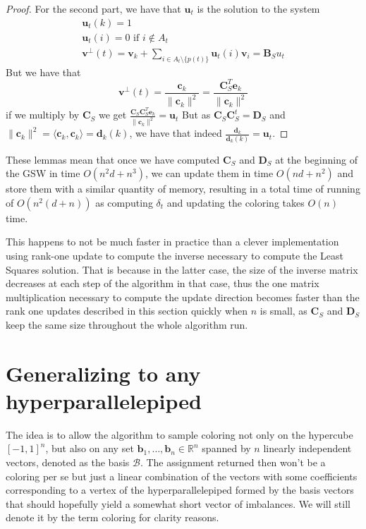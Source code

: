 \documentclass[12pt]{article}
\begin{document}
\begin{proof}
For the second part, we have that $\textbf{u}_t$ is the solution to the system \begin{align*}\textbf{u}_t(k) =1\\
            \textbf{u}_t(i) =0 \text{ if } i \notin A_t\\
            \textbf{v}^\perp(t) = \textbf{v}_{k} + \sum_{i \in A_t\setminus\{p(t)\}} \textbf{u}_t(i)\textbf{v}_i=\textbf{B}_Su_t\end{align*}
But we have that $$\textbf{v}^\perp(t)=\frac{\textbf{c}_k}{\|\textbf{c}_k\|^2}=\frac{\textbf{C}_S^T\textbf{e}_k}{\|\textbf{c}_k\|^2}$$
if we multiply by $\textbf{C}_S$ we get $\frac{\textbf{C}_S\textbf{C}_S^T\textbf{e}_k}{\|\textbf{c}_k\|^2}=\textbf{u}_t$ But as $\textbf{C}_S\textbf{C}_S^t=\textbf{D}_S$ and $\|\textbf{c}_k\|^2=\langle \textbf{c}_k,\textbf{c}_k\rangle=\textbf{d}_k(k)$, we have that indeed $\frac{\textbf{d}_k}{\textbf{d}_k(k)}=\textbf{u}_t$.
\end{proof}
These lemmas mean that once we have computed $\textbf{C}_S$ and $\textbf{D}_S$ at the beginning of the GSW in time $O(n^2d+n^3)$, we can update them in time $O(nd+n^2)$ and store them with a similar quantity of memory, resulting in a total time of running of $O(n^2(d+n))$ as computing $\delta_t$ and updating the coloring takes $O(n)$ time.

This happens to not be much faster in practice than a clever implementation using rank-one update to compute the inverse necessary to compute the Least Squares solution. That is because in the latter case, the size of the inverse matrix decreases at each step of the algorithm in that case, thus the one matrix multiplication necessary to compute the update direction becomes faster than the rank one updates described in this section quickly when $n$ is small, as $\textbf{C}_S$ and $\textbf{D}_S$ keep the same size throughout the whole algorithm run.


\section{Generalizing to any hyperparallelepiped}\label{different_basis_section}
The idea is to allow the algorithm to sample coloring not only on the hypercube $[-1,1]^n$, but also on any set $\textbf{b}_1,\dots, \textbf{b}_n\in\mathbb{R}^n$ spanned by $n$ linearly independent vectors, denoted as the basis $\mathcal{B}$. The assignment returned then won't be a coloring per se but just a linear combination of the vectors with some coefficients corresponding to a vertex of the hyperparallelepiped formed by the basis vectors that should hopefully yield a somewhat short vector of imbalances. We will still denote it by the term coloring for clarity reasons.
\end{document}
